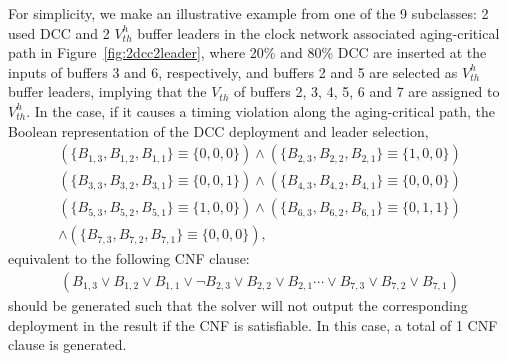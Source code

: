 For simplicity, we make an illustrative example from one of the 9 subclasses: 2 used DCC and 2 $V_{th}^h$ buffer leaders in the clock network associated aging-critical path in Figure~\ref{fig:2dcc2leader}, where 20\% and 80\% DCC are inserted at the inputs of buffers 3 and 6, respectively, and buffers 2 and 5 are selected as $V_{th}^h$ buffer leaders, implying that the $V_{th}$ of buffers 2, 3, 4, 5, 6 and 7 are assigned to $V_{th}^h$. In the case, if it causes a timing violation along the aging-critical path, the Boolean representation of the DCC deployment and leader selection,
{\fontsize{9}{10}
\begin{gather*}
\left(\{B_{1,3}, B_{1,2}, B_{1,1}\} \equiv \{0, 0, 0\} \right) \land \left( \{B_{2,3}, B_{2,2}, B_{2,1}\} \equiv \{1, 0, 0\} \right)\\ 
\left(\{B_{3,3}, B_{3,2}, B_{3,1}\} \equiv \{0, 0, 1\} \right) \land \left( \{B_{4,3}, B_{4,2}, B_{4,1}\} \equiv \{0, 0, 0\} \right)\\
\left(\{B_{5,3}, B_{5,2}, B_{5,1}\} \equiv \{1, 0, 0\} \right) \land \left( \{B_{6,3}, B_{6,2}, B_{6,1}\} \equiv \{0, 1, 1\} \right)\\
\land \left( \{B_{7,3}, B_{7,2}, B_{7,1}\} \equiv \{0, 0, 0\} \right),
\end{gather*}}
equivalent to the following CNF clause:
{\fontsize{9}{10}
\begin{gather*}
(B_{1,3} \lor B_{1,2} \lor B_{1,1} \lor \neg B_{2,3} \lor B_{2,2} \lor B_{2,1} \dotsb \lor B_{7,3} \lor B_{7,2} \lor B_{7,1} )
\end{gather*}}
should be generated such that the solver will not output the corresponding deployment in the result if the CNF is satisfiable. In this case, a total of 1 CNF clause is generated.

